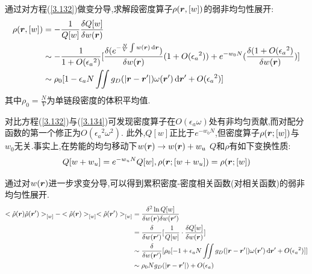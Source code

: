 通过对方程(\ref{3.132})做变分导,求解段密度算子$\rho(\bm{r} ,[w])$的弱非均匀性展开:
\begin{equation}
\begin{aligned}
\rho(\bm{r} ,[w]) &= -\frac{1}{Q[w]} \frac{\delta Q[w]}{\delta w(\bm{r} )} \\
                     &\sim -\frac{1}{1+O({\epsilon_a}^2)} [\frac{\delta (e^{-\frac{N}{V} \int w(\bm{r} )\,\mathrm{d}\bm{r} })}{\delta w(\bm{r} )}(1+O({\epsilon_a}^2)) + e^{-w_0 N}(\frac{\delta (1+O({\epsilon_a}^2)}{\delta w(\bm{r} )}) ] \\
                     &\sim \rho_0[1-\epsilon_a N \iint g_D(|\bm{r} -\bm{r} '|) \omega(\bm{r} ')\,\mathrm{d} \bm{r} '+O({\epsilon_a}^2)]
\end{aligned}
\label{3.134}
\end{equation}
其中$\rho_0 = \frac{N}{V}$为单链段密度的体积平均值.

对比方程(\ref{3.132})与(\ref{3.134})可发现密度算子在$O(\epsilon_a \omega)$处有非均匀贡献,而对配分函数的第一个修正为$O({\epsilon_a}^2 {\omega}^2)$.
此外,$Q[w]$正比于$e^{-w_0 N}$,但密度算子$\rho(\bm{r} ;[w])$与$w_0$无关.事实上,在势能的均匀移动下$w(\bm{r} ) \rightarrow w(\bm{r} )+w_u$
$Q$和$\rho$有如下变换性质:
\begin{equation}
Q[w+w_u] = e^{-w_u N}Q[w]	,	\rho(\bm{r} ;[w+w_u]) = \rho(\bm{r} ;[w])
\end{equation}

通过对$w(\bm{r} )$进一步求变分导,可以得到累积密度-密度相关函数(对相关函数)的弱非均匀性展开.
\begin{equation}
\begin{aligned}
{<\hat{\rho}(\bm{r})\hat{\rho}(\bm{r}')>}_{[w]}-{<\hat{\rho}(\bm{r} )>}_{[w]}{<\hat{\rho}(\bm{r} ')>}_{[w]} &= \frac{\delta^2 \ln Q[w]}{\delta w(\bm{r} ) \delta w(\bm{r} ')} \\ &= \frac{\delta}{\delta w(\bm{r} ')}[\frac{1}{Q[w]} \cdot \frac{\delta Q[w]}{\delta w(\bm{r} )}] \\ &\sim \frac{\delta}{\delta w(\bm{r} ')}[\rho_0[-1+\epsilon_a N \iint g_D(|\bm{r} -\bm{r} '|) \omega(\bm{r} ')\,\mathrm{d} \bm{r} '+O({\epsilon_a}^2)]] \\ &\sim \rho_0 N g_D(|\bm{r} -\bm{r} '|)+O(\epsilon_a)
\end{aligned}
\end{equation}

